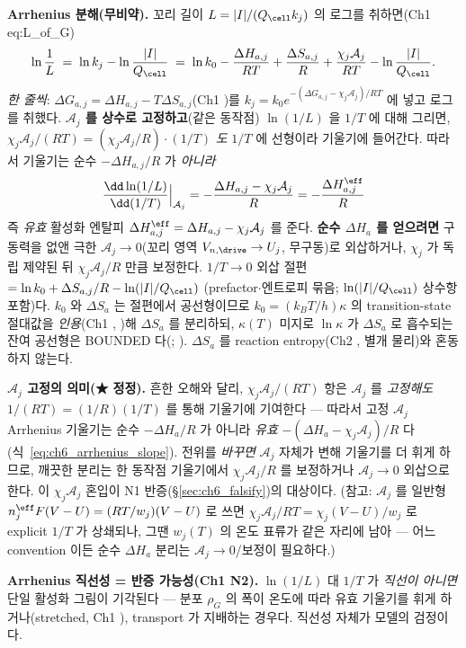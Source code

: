 \textbf{Arrhenius 분해(무비약).} 꼬리 길이 $L=|I|/(Q_\cell k_j)$ 의 로그를 취하면(Ch1 eq:L\_of\_G)
\begin{equation}
\ln\frac1L\;=\;\ln k_j-\ln\frac{|I|}{Q_\cell}\;=\;\ln k_0-\frac{\Delta H_{a,j}}{RT}+\frac{\Delta S_{a,j}}{R}
+\frac{\chi_j\mathcal A_j}{RT}-\ln\frac{|I|}{Q_\cell}.
\label{eq:ch6_arrhenius}
\end{equation}
\emph{한 줄씩}: $\Delta G_{a,j}=\Delta H_{a,j}-T\Delta S_{a,j}$(Ch1 )를 $k_j=k_0 e^{-(\Delta G_{a,j}-\chi_j
\mathcal A_j)/RT}$ 에 넣고 로그를 취했다. \textbf{$\mathcal A_j$ 를 상수로 고정하고}(같은 동작점) $\ln(1/L)$ 을 $1/T$ 에
대해 그리면, $\chi_j\mathcal A_j/(RT)=(\chi_j\mathcal A_j/R)\cdot(1/T)$ \emph{도} $1/T$ 에 선형이라 기울기에 들어간다.
따라서 기울기는 순수 $-\Delta H_{a,j}/R$ 가 \emph{아니라}
\begin{equation}
\frac{\dd\ln(1/L)}{\dd(1/T)}\Big|_{\mathcal A_j}=-\frac{\Delta H_{a,j}-\chi_j\mathcal A_j}{R}=-\frac{\Delta H_{a,j}^{\eff}}{R}
\label{eq:ch6_arrhenius_slope}
\end{equation}
즉 \emph{유효} 활성화 엔탈피 $\Delta H_{a,j}^{\eff}=\Delta H_{a,j}-\chi_j\mathcal A_j$ 를 준다. \textbf{순수 $\Delta H_a$ 를
얻으려면} 구동력을 없앤 극한 $\mathcal A_j\to0$(꼬리 영역 $V_{n,\drive}\to U_j$, 무구동)로 외삽하거나, $\chi_j$ 가 독립
제약된 뒤 $\chi_j\mathcal A_j/R$ 만큼 보정한다. $1/T\to0$ 외삽 절편 $=\ln k_0+\Delta S_{a,j}/R-\ln(|I|/Q_\cell)$
(prefactor$\cdot$엔트로피 묶음; $\ln(|I|/Q_\cell)$ 상수항 포함)다. $k_0$ 와 $\Delta S_a$ 는 절편에서 공선형이므로
$k_0=(k_BT/h)\kappa$ 의 transition-state 절대값을 \emph{인용}(Ch1 , \cite{eyring1935})해 $\Delta S_a$ 를
분리하되, $\kappa(T)$ 미지로 $\ln\kappa$ 가 $\Delta S_a$ 로 흡수되는 잔여 공선형은 BOUNDED 다(;
\cite{bardfaulkner}). $\Delta S_a$ 를 reaction entropy(Ch2 , 별개 물리)와 혼동하지 않는다.
\begin{boundbox}
\textbf{$\mathcal A_j$ 고정의 의미(★ 정정).} 흔한 오해와 달리, $\chi_j\mathcal A_j/(RT)$ 항은 $\mathcal A_j$ 를
\emph{고정해도} $1/(RT)=(1/R)(1/T)$ 를 통해 기울기에 기여한다 — 따라서 고정 $\mathcal A_j$ Arrhenius 기울기는 순수
$-\Delta H_a/R$ 가 아니라 \emph{유효} $-(\Delta H_a-\chi_j\mathcal A_j)/R$ 다(식~\eqref{eq:ch6_arrhenius_slope}).
전위를 \emph{바꾸면} $\mathcal A_j$ 자체가 변해 기울기를 더 휘게 하므로, 깨끗한 분리는 한 동작점 기울기에서
$\chi_j\mathcal A_j/R$ 를 보정하거나 $\mathcal A_j\to0$ 외삽으로 한다. 이 $\chi_j\mathcal A_j$ 혼입이 N1
반증(\S\ref{sec:ch6_falsify})의 대상이다. (참고: $\mathcal A_j$ 를 일반형 $n_j^\eff F(V-U)=(RT/w_j)(V-U)$ 로 쓰면
$\chi_j\mathcal A_j/RT=\chi_j(V-U)/w_j$ 로 explicit $1/T$ 가 상쇄되나, 그땐 $w_j(T)$ 의 온도 표류가 같은 자리에 남아
— 어느 convention 이든 순수 $\Delta H_a$ 분리는 $\mathcal A_j\to0$/보정이 필요하다.)
\end{boundbox}
\textbf{Arrhenius 직선성 = 반증 가능성(Ch1 N2).} $\ln(1/L)$ 대 $1/T$ 가 \emph{직선이 아니면} 단일 활성화 그림이
기각된다 — 분포 $\rho_G$ 의 폭이 온도에 따라 유효 기울기를 휘게 하거나(stretched, Ch1 ), transport 가
지배하는 경우다. 직선성 자체가 모델의 검정이다.

